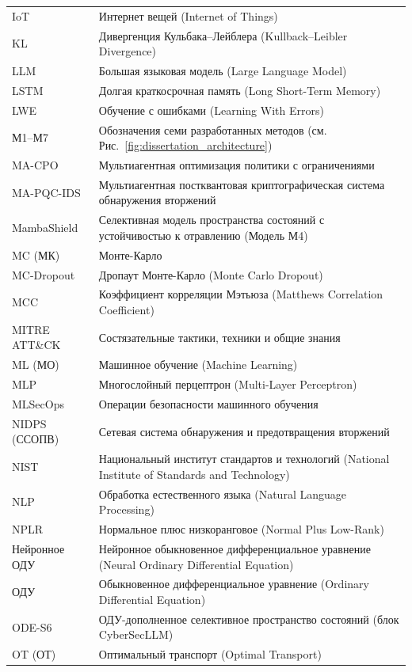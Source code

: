 \begin{longtable}{@{}p{3.8cm} p{10cm}@{}}
IoT & Интернет вещей (Internet of Things) \\
KL & Дивергенция Кульбака--Лейблера (Kullback--Leibler Divergence) \\
LLM & Большая языковая модель (Large Language Model) \\
LSTM & Долгая краткосрочная память (Long Short-Term Memory) \\
LWE & Обучение с ошибками (Learning With Errors) \\
М1--М7 & Обозначения семи разработанных методов (см. Рис.~\ref{fig:dissertation_architecture}) \\
MA-CPO & Мультиагентная оптимизация политики с ограничениями \\
MA-PQC-IDS & Мультиагентная постквантовая криптографическая система обнаружения вторжений \\
MambaShield & Селективная модель пространства состояний с устойчивостью к отравлению (Модель М4) \\
MC (МК) & Монте-Карло \\
MC-Dropout & Дропаут Монте-Карло (Monte Carlo Dropout) \\
MCC & Коэффициент корреляции Мэтьюза (Matthews Correlation Coefficient) \\
MITRE ATT\&CK & Состязательные тактики, техники и общие знания \\
ML (МО) & Машинное обучение (Machine Learning) \\
MLP & Многослойный перцептрон (Multi-Layer Perceptron) \\
MLSecOps & Операции безопасности машинного обучения \\
NIDPS (ССОПВ) & Сетевая система обнаружения и предотвращения вторжений \\
NIST & Национальный институт стандартов и технологий (National Institute of Standards and Technology) \\
NLP & Обработка естественного языка (Natural Language Processing) \\
NPLR & Нормальное плюс низкоранговое (Normal Plus Low-Rank) \\
Нейронное ОДУ & Нейронное обыкновенное дифференциальное уравнение (Neural Ordinary Differential Equation) \\
ОДУ & Обыкновенное дифференциальное уравнение (Ordinary Differential Equation) \\
ODE-S6 & ОДУ-дополненное селективное пространство состояний (блок CyberSecLLM) \\
OT (ОТ) & Оптимальный транспорт (Optimal Transport) \\

\end{longtable}
